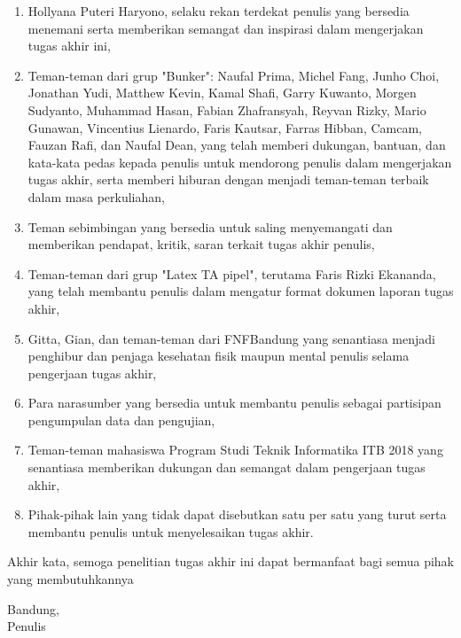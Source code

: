 \begin{enumerate}
  \item Hollyana Puteri Haryono, selaku rekan terdekat penulis yang bersedia menemani serta memberikan semangat dan inspirasi dalam mengerjakan tugas akhir ini,
  
  
  \item Teman-teman dari grup "Bunker": Naufal Prima, Michel Fang, Junho Choi, Jonathan Yudi, Matthew Kevin, Kamal Shafi, Garry Kuwanto, Morgen Sudyanto, Muhammad Hasan, Fabian Zhafransyah, Reyvan Rizky, Mario Gunawan, Vincentius Lienardo, Faris Kautsar, Farras Hibban, Camcam, Fauzan Rafi, dan Naufal Dean, yang telah memberi dukungan, bantuan, dan kata-kata pedas kepada penulis untuk mendorong penulis dalam mengerjakan tugas akhir, serta memberi hiburan dengan menjadi teman-teman terbaik dalam masa perkuliahan,
  
  \item Teman sebimbingan yang bersedia untuk saling menyemangati dan memberikan pendapat, kritik, saran terkait tugas akhir penulis,
  
  \item Teman-teman dari grup "Latex TA pipel", terutama Faris Rizki Ekananda, yang telah membantu penulis dalam mengatur format dokumen laporan tugas akhir,
  
  \item Gitta, Gian, dan teman-teman dari FNFBandung yang senantiasa menjadi penghibur dan penjaga kesehatan fisik maupun mental penulis selama pengerjaan tugas akhir,
  
  \item Para narasumber yang bersedia untuk membantu penulis sebagai partisipan pengumpulan data dan pengujian,

  \item Teman-teman mahasiswa Program Studi Teknik Informatika ITB 2018 yang senantiasa memberikan dukungan dan semangat dalam pengerjaan tugas akhir,
   
  \item Pihak-pihak lain yang tidak dapat disebutkan satu per satu yang turut serta membantu penulis untuk menyelesaikan tugas akhir.
   
\end{enumerate}

Akhir kata, semoga penelitian tugas akhir ini dapat bermanfaat bagi semua pihak yang membutuhkannya

\vspace{1mm}

\begin{flushright}
  Bandung, \thedate \\
  \vspace{2.5cm}
  Penulis
\end{flushright}
\vfill

